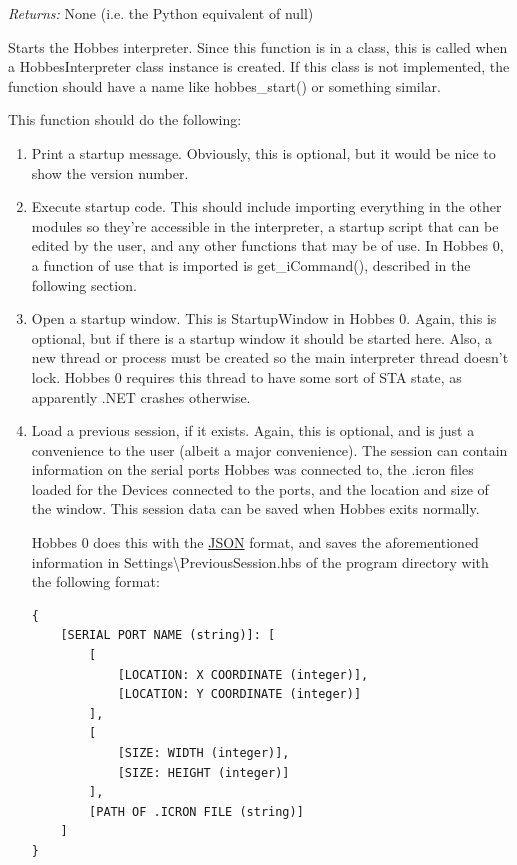 \documentclass[12pt,letterpaper]{article}
\begin{document}
\emph{Returns:} None (i.e. the Python equivalent of null)

Starts the Hobbes interpreter. Since this function is in a class, this is called when a HobbesInterpreter class instance is created. If this class is not implemented, the function should have a name like hobbes\_start() or something similar.

This function should do the following:

\begin{enumerate}

\item Print a startup message. Obviously, this is optional, but it would be nice to show the version number.

\item Execute startup code. This should include importing everything in the other modules so they're accessible in the interpreter, a startup script that can be edited by the user, and any other functions that may be of use. In Hobbes 0, a function of use that is imported is get\_iCommand(), described in the following section.

\item Open a startup window. This is StartupWindow in Hobbes 0. Again, this is optional, but if there is a startup window it should be started here. Also, a new thread or process must be created so the main interpreter thread doesn't lock. Hobbes 0 requires this thread to have some sort of STA state, as apparently .NET crashes otherwise.

\item Load a previous session, if it exists. Again, this is optional, and is just a convenience to the user (albeit a major convenience). The session can contain information on the serial ports Hobbes was connected to, the .icron files loaded for the Devices connected to the ports, and the location and size of the window. This session data can be saved when Hobbes exits normally.

Hobbes 0 does this with the \href{http://www.json.org/}{JSON} format, and saves the aforementioned information in Settings\textbackslash PreviousSession.hbs of the program directory with the following format:

\selectfont

\begin{lstlisting}
{
    [SERIAL PORT NAME (string)]: [
        [
            [LOCATION: X COORDINATE (integer)], 
            [LOCATION: Y COORDINATE (integer)]
        ], 
        [
            [SIZE: WIDTH (integer)], 
            [SIZE: HEIGHT (integer)]
        ], 
        [PATH OF .ICRON FILE (string)]
    ]
}
\end{lstlisting}


\end{enumerate}
\end{document}
